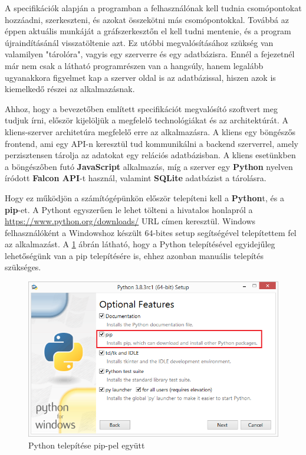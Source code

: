 

A specifikációk alapján a programban a felhasználónak kell tudnia csomópontokat hozzáadni, szerkeszteni, és azokat összekötni más csomópontokkal. Továbbá az éppen aktuális munkáját a gráfszerkesztőn el kell tudni mentenie, és a program újraindításánál visszatöltenie azt. Ez utóbbi megvalósításához szükség van valamilyen "tárolóra", vagyis egy szerverre és egy adatbázisra. Ennél a fejezetnél már nem csak a látható programrészen van a hangsúly, hanem legalább ugyanakkora figyelmet kap a szerver oldal is az adatbázissal, hiszen azok is kiemelkedő részei az alkalmazásnak.


Ahhoz, hogy a bevezetőben említett specifikációt megvalósító szoftvert meg tudjuk írni, először kijelöljük a megfelelő technológiákat és az architektúrát. A kliens-szerver architetúra megfelelő erre az alkalmazásra. A kliens egy böngészős frontend, ami egy API-n keresztül tud kommunikálni a backend szerverrel, amely perzisztensen tárolja az adatokat egy relációs adatbázisban. A kliens esetünkben a böngészőben futó \textbf{JavaScript} alkalmazás, míg a szerver egy \textbf{Python} nyelven íródott \textbf{Falcon API}-t használ, valamint \textbf{SQLite} adatbázist a tárolásra.
 
Hogy ez működjön a számítógépünkön először telepíteni kell a \textbf{Python}t, és a \textbf{pip}-et. A Pythont egyszerűen le lehet tölteni a hivatalos honlapról a \url{https://www.python.org/downloads/} URL címen keresztül. Windows felhasználóként a Windowshoz készült 64-bites setup segítségével telepítettem fel az alkalmazást. A \ref{fig:pyt1} ábrán látható, hogy a Python telepítésével egyidejűleg lehetőségünk van a pip telepítésére is, ehhez azonban manuális telepítés szükséges.

\begin{figure}[h]
\centering
\includegraphics[scale=0.7]{images/python1.png}
\caption{Python telepítése pip-pel együtt}
\label{fig:pyt1}
\end{figure}

